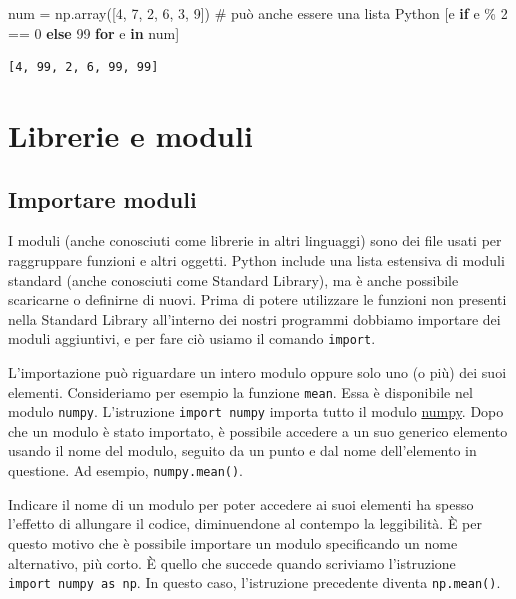 \documentclass[
  letterpaper,
  krantz2]{{[}./krantz{]}}
\newenvironment{Shaded}{\begin{snugshade}}{\end{snugshade}}
\newcommand{\CommentTok}[1]{\textcolor[rgb]{0.37,0.37,0.37}{#1}}
\newcommand{\ControlFlowTok}[1]{\textcolor[rgb]{0.00,0.23,0.31}{\textbf{#1}}}
\newcommand{\DecValTok}[1]{\textcolor[rgb]{0.68,0.00,0.00}{#1}}
\newcommand{\KeywordTok}[1]{\textcolor[rgb]{0.00,0.23,0.31}{\textbf{#1}}}
\newcommand{\NormalTok}[1]{\textcolor[rgb]{0.00,0.23,0.31}{#1}}
\newcommand{\OperatorTok}[1]{\textcolor[rgb]{0.37,0.37,0.37}{#1}}
\begin{document}
\begin{Shaded}
\begin{Highlighting}[]
\NormalTok{num }\OperatorTok{=}\NormalTok{ np.array([}\DecValTok{4}\NormalTok{, }\DecValTok{7}\NormalTok{, }\DecValTok{2}\NormalTok{, }\DecValTok{6}\NormalTok{, }\DecValTok{3}\NormalTok{, }\DecValTok{9}\NormalTok{])  }\CommentTok{\# può anche essere una lista Python}
\NormalTok{[e }\ControlFlowTok{if}\NormalTok{ e }\OperatorTok{\%} \DecValTok{2} \OperatorTok{==} \DecValTok{0} \ControlFlowTok{else} \DecValTok{99} \ControlFlowTok{for}\NormalTok{ e }\KeywordTok{in}\NormalTok{ num]}
\end{Highlighting}
\end{Shaded}

\begin{verbatim}
[4, 99, 2, 6, 99, 99]
\end{verbatim}

\section{Librerie e moduli}\label{librerie-e-moduli}

\subsection{Importare moduli}\label{importare-moduli}

I moduli (anche conosciuti come librerie in altri linguaggi) sono dei
file usati per raggruppare funzioni e altri oggetti. Python include una
lista estensiva di moduli standard (anche conosciuti come Standard
Library), ma è anche possibile scaricarne o definirne di nuovi. Prima di
potere utilizzare le funzioni non presenti nella Standard Library
all'interno dei nostri programmi dobbiamo importare dei moduli
aggiuntivi, e per fare ciò usiamo il comando \texttt{import}.

L'importazione può riguardare un intero modulo oppure solo uno (o più)
dei suoi elementi. Consideriamo per esempio la funzione \texttt{mean}.
Essa è disponibile nel modulo \texttt{numpy}. L'istruzione
\texttt{import\ numpy} importa tutto il modulo
\href{http://www.numpy.org}{numpy}. Dopo che un modulo è stato
importato, è possibile accedere a un suo generico elemento usando il
nome del modulo, seguito da un punto e dal nome dell'elemento in
questione. Ad esempio, \texttt{numpy.mean()}.

Indicare il nome di un modulo per poter accedere ai suoi elementi ha
spesso l'effetto di allungare il codice, diminuendone al contempo la
leggibilità. È per questo motivo che è possibile importare un modulo
specificando un nome alternativo, più corto. È quello che succede quando
scriviamo l'istruzione \texttt{import\ numpy\ as\ np}. In questo caso,
l'istruzione precedente diventa \texttt{np.mean()}.
\end{document}
